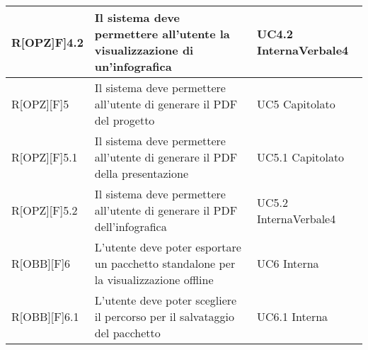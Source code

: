 \begin{table}[H]
\begin{tabular}{|p{}|p{}|p{}|}
			R[OPZ]F]4.2 & Il sistema deve permettere all'utente la visualizzazione
			di un'infografica & UC4.2 Interna\newline Verbale4\\ \midrule 
			R[OPZ][F]5 & Il sistema deve permettere all'utente di generare il PDF del progetto & UC5 Capitolato\\ \midrule 
			R[OPZ][F]5.1 & Il sistema deve permettere all'utente di generare il
			PDF della presentazione & UC5.1 Capitolato\\ \midrule 
			R[OPZ][F]5.2 & Il sistema deve permettere all'utente di generare il
			PDF dell'infografica & UC5.2 Interna\newline Verbale4\\ \midrule 
			R[OBB][F]6 & L'utente deve poter esportare un pacchetto standalone per la visualizzazione offline & UC6 Interna\\ \midrule 
			R[OBB][F]6.1 & L'utente deve poter scegliere il percorso per il
			salvataggio del pacchetto & UC6.1 Interna\\ \midrule 
		\end{tabular}
	\end{table}
	\newpage

